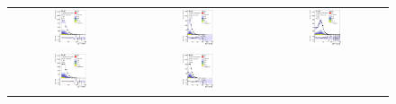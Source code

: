\begin{figure}[tp]
  \centering
  \begin{tabular}{ccc}
  \includegraphics[width=0.27\textwidth]{Analysis/Figures_ttH/tesis_vars/prefit/lep_pt_5jetex3btagex.eps} &
  \includegraphics[width=0.27\textwidth]{Analysis/Figures_ttH/tesis_vars/prefit/met_5jetex3btagex.eps} &
  \includegraphics[width=0.27\textwidth]{Analysis/Figures_ttH/tesis_vars/prefit/WlepMT_5jetex3btagex.eps} \\
  \includegraphics[width=0.27\textwidth]{Analysis/Figures_ttH/tesis_vars/postfit/lep_pt_5jetex3btagex.eps} &
  \includegraphics[width=0.27\textwidth]{Analysis/Figures_ttH/tesis_vars/postfit/met_5jetex3btagex.eps} &

\end{tabular}
\end{figure}

